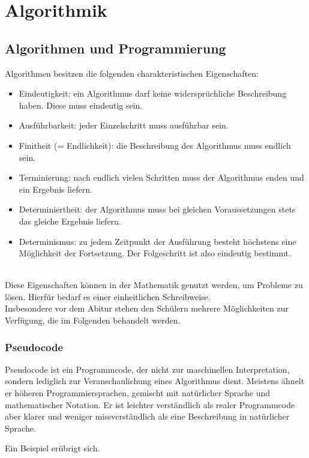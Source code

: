 \documentclass[main.tex]{subfiles}
\begin{document}
\chapter{Algorithmik}

\section{Algorithmen und Programmierung}
\begin{Definition}
	Algorithmen besitzen die folgenden charakteristischen Eigenschaften:
	\begin{itemize}
		\item Eindeutigkeit: ein Algorithmus darf keine widersprüchliche Beschreibung haben. Diese muss eindeutig sein.
		\item Ausführbarkeit: jeder Einzelschritt muss ausführbar sein.
		\item Finitheit (= Endlichkeit): die Beschreibung des Algorithmus muss endlich sein.
		\item Terminierung: nach endlich vielen Schritten muss der Algorithmus enden und ein Ergebnis liefern.
		\item Determiniertheit: der Algorithmus muss bei gleichen Voraussetzungen stets das gleiche Ergebnis liefern.
		\item   Determinismus: zu jedem Zeitpunkt der Ausführung besteht höchstens eine Möglichkeit der Fortsetzung. Der Folgeschritt ist also eindeutig bestimmt.
	\end{itemize}
\end{Definition}
\\
Diese Eigenschaften können in der Mathematik genutzt werden, um Probleme zu lösen. Hierfür bedarf es einer einheitlichen Schreibweise.\\
Insbesondere vor dem Abitur stehen den Schülern mehrere Möglichkeiten zur Verfügung, die im Folgenden behandelt werden.
\subsection{Pseudocode}
Pseudocode ist ein Programmcode, der nicht zur maschinellen Interpretation, sondern lediglich zur Veranschaulichung eines Algorithmus dient. Meistens ähnelt er höheren Programmiersprachen, gemischt mit natürlicher Sprache und mathematischer Notation. Er ist leichter verständlich als realer Programmcode aber klarer und weniger missverständlich als eine Beschreibung in natürlicher Sprache.
\begin{Beispiel}
	Ein Beispiel erübrigt sich.
\end{Beispiel}
\end{document}
